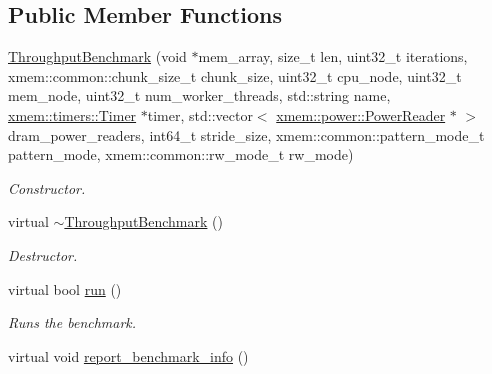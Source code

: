 \subsection*{Public Member Functions}
\begin{DoxyCompactItemize}
\item 
\hyperlink{classxmem_1_1benchmark_1_1_throughput_benchmark_a7f6fcc030500ebd3aed37d7eacea68dc}{Throughput\+Benchmark} (void $\ast$mem\+\_\+array, size\+\_\+t len, uint32\+\_\+t iterations, xmem\+::common\+::chunk\+\_\+size\+\_\+t chunk\+\_\+size, uint32\+\_\+t cpu\+\_\+node, uint32\+\_\+t mem\+\_\+node, uint32\+\_\+t num\+\_\+worker\+\_\+threads, std\+::string name, \hyperlink{classxmem_1_1timers_1_1_timer}{xmem\+::timers\+::\+Timer} $\ast$timer, std\+::vector$<$ \hyperlink{classxmem_1_1power_1_1_power_reader}{xmem\+::power\+::\+Power\+Reader} $\ast$ $>$ dram\+\_\+power\+\_\+readers, int64\+\_\+t stride\+\_\+size, xmem\+::common\+::pattern\+\_\+mode\+\_\+t pattern\+\_\+mode, xmem\+::common\+::rw\+\_\+mode\+\_\+t rw\+\_\+mode)
\begin{DoxyCompactList}\small\item\em Constructor. \end{DoxyCompactList}\item 
\hypertarget{classxmem_1_1benchmark_1_1_throughput_benchmark_ad4adc2b57b501862bfa415c4adfdef7e}{}virtual \hyperlink{classxmem_1_1benchmark_1_1_throughput_benchmark_ad4adc2b57b501862bfa415c4adfdef7e}{$\sim$\+Throughput\+Benchmark} ()\label{classxmem_1_1benchmark_1_1_throughput_benchmark_ad4adc2b57b501862bfa415c4adfdef7e}

\begin{DoxyCompactList}\small\item\em Destructor. \end{DoxyCompactList}\item 
virtual bool \hyperlink{classxmem_1_1benchmark_1_1_throughput_benchmark_a9f113e51d980830582148eb05c8810a3}{run} ()
\begin{DoxyCompactList}\small\item\em Runs the benchmark. \end{DoxyCompactList}\item 
\hypertarget{classxmem_1_1benchmark_1_1_throughput_benchmark_aab821d4beb68616c5a939bc2e493426e}{}virtual void \hyperlink{classxmem_1_1benchmark_1_1_throughput_benchmark_aab821d4beb68616c5a939bc2e493426e}{report\+\_\+benchmark\+\_\+info} ()\label{classxmem_1_1benchmark_1_1_throughput_benchmark_aab821d4beb68616c5a939bc2e493426e}


\end{DoxyCompactItemize}
